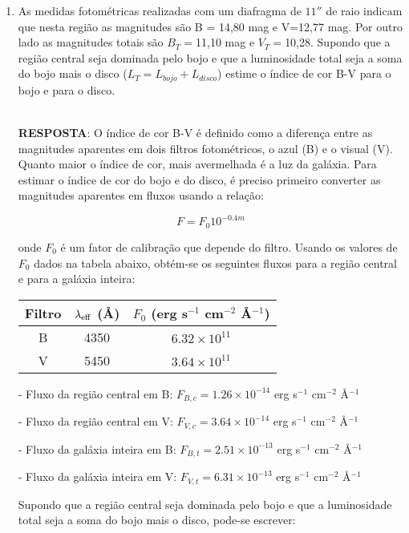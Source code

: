 \documentclass[a4paper,12pt]{article}
\begin{document}
\begin{enumerate}
\begin{enumerate}
\item As medidas fotométricas realizadas com um diafragma de $11''$ de raio indicam que nesta região as magnitudes são B = 14,80 mag e V=12,77 mag. Por outro lado as magnitudes totais são $B_T=$11,10 mag e $V_T=$10,28. Supondo que a região central seja dominada pelo bojo e que a luminosidade total seja a soma do bojo mais o disco ($L_T=L_{bojo} + L_{disco}$) estime o índice de cor B-V para o bojo e para o disco.

\noindent\hrulefill\\\textbf{RESPOSTA}:  O índice de cor B-V é definido como a diferença entre as magnitudes aparentes em dois filtros fotométricos, o azul (B) e o visual (V). Quanto maior o índice de cor, mais avermelhada é a luz da galáxia. Para estimar o índice de cor do bojo e do disco, é preciso primeiro converter as magnitudes aparentes em fluxos usando a relação:

$$F = F_0 10^{-0.4 m}$$

onde $F_0$ é um fator de calibração que depende do filtro. Usando os valores de $F_0$ dados na tabela abaixo, obtém-se os seguintes fluxos para a região central e para a galáxia inteira:

\begin{center}
\begin{tabular}{|c|c|c|}
\hline
Filtro & $\lambda_{\rm eff}$ (Å) & $F_0$ (erg s$^{-1}$ cm$^{-2}$ Å$^{-1}$) \\
\hline
B      & 4350                   & $6.32 \times 10^{11}$                 \\
\hline
V      & 5450                   & $3.64 \times 10^{11}$                 \\
\hline
\end{tabular}
\end{center}

- Fluxo da região central em B: $F_{B,c} = 1.26 \times 10^{-14}$ erg s$^{-1}$ cm$^{-2}$ Å$^{-1}$

- Fluxo da região central em V: $F_{V,c} = 3.64 \times 10^{-14}$ erg s$^{-1}$ cm$^{-2}$ Å$^{-1}$

- Fluxo da galáxia inteira em B: $F_{B,t} = 2.51 \times 10^{-13}$ erg s$^{-1}$ cm$^{-2}$ Å$^{-1}$

- Fluxo da galáxia inteira em V: $F_{V,t} = 6.31 \times 10^{-13}$ erg s$^{-1}$ cm$^{-2}$ Å$^{-1}$

Supondo que a região central seja dominada pelo bojo e que a luminosidade total seja a soma do bojo mais o disco, pode-se escrever:


\end{enumerate}
\end{enumerate}
\end{document}
